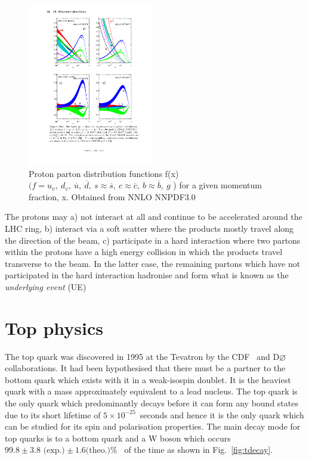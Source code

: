 \begin{figure}[ht!]
\begin{center}
    \includegraphics[width=0.49\textwidth]{images/Theory/pdf3.pdf}
    \caption{Proton parton distribution functions f(x) $(f = u_{v},~ d_{v},~ \overline{u},~ \overline{d},~ s\approx\overline{s},~ c\approx\overline{c},~ b\approx\overline{b},~ g$ ) for a given momentum fraction, x. Obtained from NNLO NNPDF3.0~\cite{Ball2015}}
    \label{fig:protonPDF}
\end{center}
\end{figure}

The protons may a) not interact at all and continue to be accelerated around the LHC ring, b) interact via a soft scatter where the products mostly travel along the direction of the beam, c) participate in a hard interaction where two partons within the protons have a high energy collision in which the products travel transverse to the beam. In the latter case, the remaining partons which have not participated in the hard interaction hadronise and form what is known as the \emph{underlying event} (UE)

\section{Top physics}
The top quark was discovered in 1995 at the Tevatron by the CDF~\cite{PhysRevLett.74.2626} and D$\varnothing$~\cite{Abachi:1995iq} collaborations. It had been hypothesised that there must be a partner to the bottom quark which exists with it in a weak-isospin doublet. It is the heaviest quark with a mass approximately equivalent to a lead nucleus. The top quark is the only quark which predominantly decays before it can form any bound states due to its short lifetime of $5\times10^{-25}$~seconds and hence it is the only quark which can be studied for its spin and polarisation properties. The main decay mode for top quarks is to a bottom quark and a W boson which occurs $99.8\pm3.8\textrm{ (exp.)}\pm1.6\textrm {(theo.)} \%$~\cite{2014arXiv1403.7366C} of the time as shown in Fig.~\ref{fig:tdecay}.


